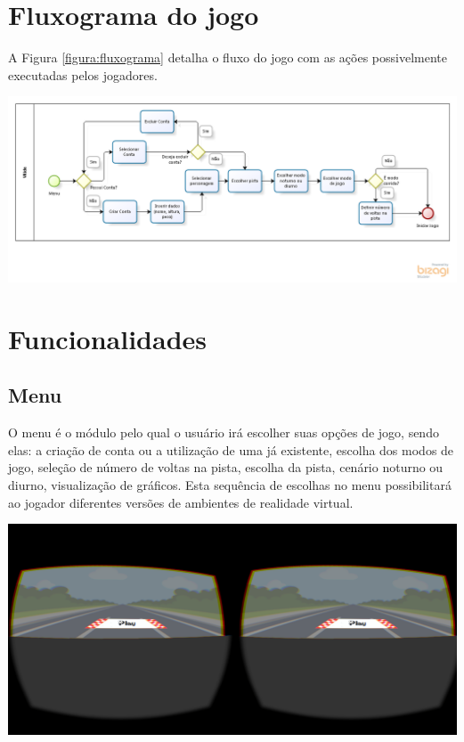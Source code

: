 \section{Fluxograma do jogo}

A Figura \ref{figura:fluxograma} detalha o fluxo do jogo com as ações possivelmente executadas pelos jogadores. 

\begin{center}
	\includegraphics[scale=0.5]{figuras/fluxograma}
	\label{figura:fluxograma}
\end{center}

\section{Funcionalidades}
\subsection{Menu}
O menu é o módulo pelo qual o usuário irá escolher suas opções de jogo, sendo elas: a criação de conta ou a utilização de uma já existente, escolha dos modos de jogo, seleção de número de voltas na pista, escolha da pista, cenário noturno ou diurno, visualização de gráficos. Esta sequência de escolhas no menu possibilitará ao jogador diferentes versões de ambientes de realidade virtual.

\begin{center}
	\includegraphics[scale=0.4]{figuras/play}
	\label{figura:play}
\end{center}


